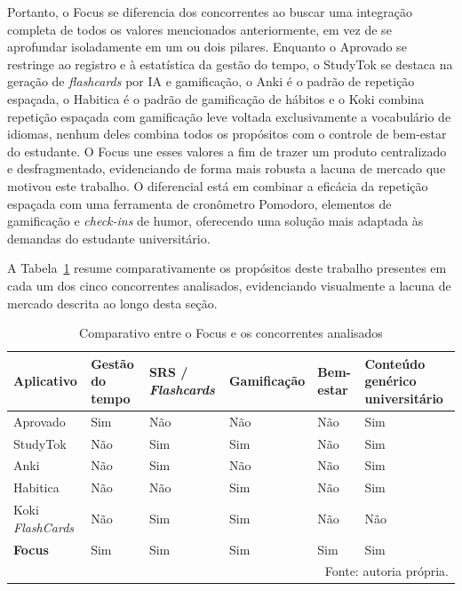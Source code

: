 Portanto, o Focus se diferencia dos concorrentes ao buscar uma integração completa de todos os valores mencionados anteriormente, em vez de se aprofundar isoladamente em um ou dois pilares.
Enquanto o Aprovado se restringe ao registro e à estatística da gestão do tempo, o StudyTok se destaca na geração de \textit{flashcards} por IA e gamificação, o Anki é o padrão de repetição espaçada, o Habitica é o padrão de gamificação de hábitos e o Koki combina repetição espaçada com gamificação leve voltada exclusivamente a vocabulário de idiomas, nenhum deles combina todos os propósitos com o controle de bem-estar do estudante.
O Focus une esses valores a fim de trazer um produto centralizado e desfragmentado, evidenciando de forma mais robusta a lacuna de mercado que motivou este trabalho.
O diferencial está em combinar a eficácia da repetição espaçada com uma ferramenta de cronômetro Pomodoro, elementos de gamificação e \textit{check-ins} de humor, oferecendo uma solução mais adaptada às demandas do estudante universitário.

A Tabela~\ref{tab:benchmark} resume comparativamente os propósitos deste trabalho presentes em cada um dos cinco concorrentes analisados, evidenciando visualmente a lacuna de mercado descrita ao longo desta seção.

\begin{table}[H]
\centering
\caption{Comparativo entre o Focus e os concorrentes analisados}
\label{tab:benchmark}
\begin{tabularx}{\textwidth}{|X|>{\centering\arraybackslash}p{2.1cm}|>{\centering\arraybackslash}p{2.1cm}|>{\centering\arraybackslash}p{2.4cm}|>{\centering\arraybackslash}p{2.1cm}|>{\centering\arraybackslash}p{2.3cm}|}
\hline
\textbf{Aplicativo} & \textbf{Gestão do tempo} & \textbf{SRS / \textit{Flashcards}} & \textbf{Gamificação} & \textbf{Bem-estar} & \textbf{Conteúdo genérico universitário} \\
\hline
Aprovado & Sim & Não & Não & Não & Sim \\
\hline
StudyTok & Não & Sim & Sim & Não & Sim \\
\hline
Anki & Não & Sim & Não & Não & Sim \\
\hline
Habitica & Não & Não & Sim & Não & Sim \\
\hline
Koki \textit{FlashCards} & Não & Sim & Sim & Não & Não \\
\hline
\textbf{Focus} & Sim & Sim & Sim & Sim & Sim \\
\hline
\multicolumn{6}{r}{\small Fonte: autoria própria.} \\
\end{tabularx}
\end{table}

